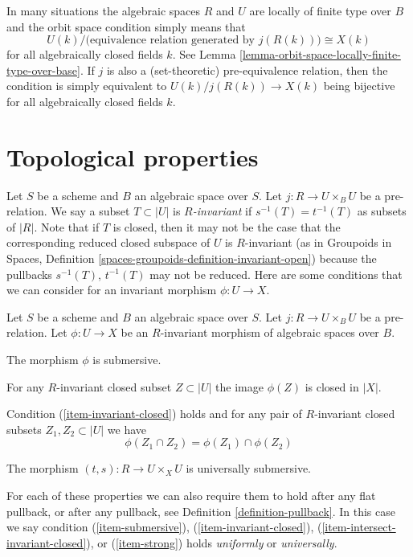 \noindent
In many situations the algebraic spaces $R$ and $U$ are locally of finite type
over $B$ and the orbit space condition simply means that
$$
U(k)/\big(\text{equivalence relation generated by }j(R(k))\big)
\cong
X(k)
$$
for all algebraically closed fields $k$. See
Lemma \ref{lemma-orbit-space-locally-finite-type-over-base}.
If $j$ is also a (set-theoretic) pre-equivalence relation, then the condition
is simply equivalent to $U(k)/j(R(k)) \to X(k)$ being bijective for all
algebraically closed fields $k$.









\section{Topological properties}
\label{section-topological}

\noindent
Let $S$ be a scheme and $B$ an algebraic space over $S$.
Let $j : R \to U \times_B U$ be a pre-relation.
We say a subset $T \subset |U|$ is {\it $R$-invariant} if
$s^{-1}(T) = t^{-1}(T)$ as subsets of $|R|$.
Note that if $T$ is closed, then it may not be the case that
the corresponding reduced closed subspace of $U$ is $R$-invariant
(as in
Groupoids in Spaces, Definition
\ref{spaces-groupoids-definition-invariant-open})
because the pullbacks $s^{-1}(T)$, $t^{-1}(T)$ may not be reduced.
Here are some conditions that we can consider for an
invariant morphism $\phi : U \to X$.

\begin{definition}
\label{definition-topological}
Let $S$ be a scheme and $B$ an algebraic space over $S$.
Let $j : R \to U \times_B U$ be a pre-relation.
Let $\phi : U \to X$ be an $R$-invariant morphism of algebraic spaces over $B$.
\begin{list}{(\thesubsubsection)}%
{\setlength{}}
\item
\label{item-submersive}
The morphism $\phi$ is submersive.
\item
\label{item-invariant-closed}
For any $R$-invariant closed subset $Z \subset |U|$ the image
$\phi(Z)$ is closed in $|X|$.
\item
\label{item-intersect-invariant-closed}
Condition (\ref{item-invariant-closed}) holds and for any pair of
$R$-invariant closed subsets $Z_1, Z_2 \subset |U|$ we have
$$
\phi(Z_1 \cap Z_2) = \phi(Z_1) \cap \phi(Z_2)
$$
\item The morphism $(t, s) : R \to U \times_X U$ is universally submersive.
\label{item-strong}
\end{list}
For each of these properties we can also require them to hold after any
flat pullback, or after any pullback, see
Definition \ref{definition-pullback}. In this case we say condition
(\ref{item-submersive}), 
(\ref{item-invariant-closed}),
(\ref{item-intersect-invariant-closed}), or
(\ref{item-strong}) holds {\it uniformly} or {\it universally}.
\end{definition}








